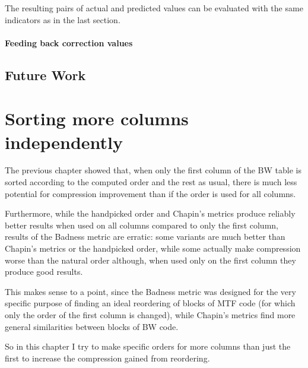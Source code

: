 \documentclass[a4paper]{scrreprt}
\begin{document}
The resulting pairs of actual and predicted values can be evaluated with the
same indicators as in the last section.


\subsubsection{Feeding back correction values}

\section{Future Work}

\chapter{Sorting more columns independently}


The previous chapter showed that, when only the first column of the BW table is
sorted according to the computed order and the rest as usual, there is much less
potential for compression improvement than if the order is used for all columns.

Furthermore, while the handpicked order and Chapin's metrics produce reliably
better results when used on all columns compared to only the first column,
results of the Badness metric are erratic: some variants are much better than
Chapin's metrics or the handpicked order, while some actually make compression
worse than the natural order although, when used only on the first column they
produce good results.

This makes sense to a point, since the Badness metric was designed for the very
specific purpose of finding an ideal reordering of blocks of MTF code (for
which only the order of the first column is changed), while Chapin's metrics
find more general similarities between blocks of BW code.

So in this chapter I try to make specific orders for more columns than just the
first to increase the compression gained from reordering.
\end{document}
